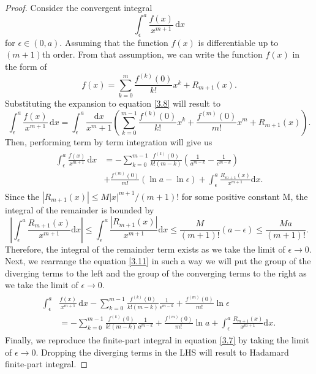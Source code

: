 \begin{proof}
Consider the convergent integral 
\begin{equation}
    \int_\epsilon^a \frac{f(x)}{x^{m+1}} \, \mathrm{d}x
    \label{3.8}
\end{equation}
for $\epsilon \in (0,a)$. Assuming that the function $f(x)$ is differentiable up to $(m+1)$th order. From that assumption, we can write the function $f(x)$ in the form of 
\begin{equation}
    f(x) = \sum_{k=0}^{m} \frac{f^{(k)}(0)}{k!} x^{k} + R_{m+1}(x).
\end{equation}
Substituting the expansion to equation \eqref{3.8} will result to
\begin{equation}
    \int_\epsilon^a \frac{f(x)}{x^{m+1}} \, \mathrm{d}x = \int_\epsilon^{a} \frac{\mathrm{d}x}{x^m+1} \left( \sum_{k=0}^{m-1} \frac{f^{(k)}(0)}{k!}x^{k} + \frac{f^{(m)}(0)}{m!}x^{m} + R_{m+1}(x) \right).
\end{equation}
Then, performing term by term integration will give us
\begin{align}
\begin{split}
    \int_\epsilon^a \frac{f(x)}{x^{m+1}} \, \mathrm{d}x & =- \sum_{k=0}^{m-1} \frac{f^{(k)}(0)}{k!(m-k)} \left( \frac{1}{a^{m-k}} - \frac{1}{\epsilon^{m-k}} \right) \\& +  \frac{f^{(m)}(0)}{m!} \left( \ln a - \ln \epsilon \right) + \int_\epsilon^{a}\frac{R_{m+1}(x)}{x^{m+1}} \mathrm{d}x.
    \label{3.11}
\end{split}
\end{align}
Since the $|R_{m+1}(x)| \leq M|x|^{m+1}/(m+1)! $ for some positive constant M, the integral of the remainder is bounded by 
\begin{equation}
   \left| \int_\epsilon^{a}\frac{R_{m+1}(x)}{x^{m+1}} \mathrm{d}x \right| \leq \int_\epsilon^{a}\frac{|R_{m+1}(x)|}{x^{m+1}} \mathrm{d}x \leq \frac{M}{(m+1)!} (a- \epsilon) \leq \frac{Ma}{(m+1)!}.
\end{equation}
Therefore, the integral of the remainder term exists as we take the limit of $\epsilon \to 0$. Next, we rearrange the equation \eqref{3.11} in such a way we will put the group of the diverging terms to the left and the group of the converging terms to the right as we take the limit of $\epsilon \to 0$.
\begin{align}
\begin{split}
    \int_\epsilon^a & \frac{f(x)}{x^{m+1}} \, \mathrm{d}x  - \sum_{k=0}^{m-1} \frac{f^{(k)}(0)}{k!(m-k)} \frac{1}{\epsilon^{m-k}} + \frac{f^{(m)}(0)}{m!} \ln \epsilon \\& = -\sum_{k=0}^{m-1} \frac{f^{(k)}(0)}{k!(m-k)} \frac{1}{a^{m-k}} +  \frac{f^{(m)}(0)}{m!} \ln a + \int_\epsilon^{a}\frac{R_{m+1}(x)}{x^{m+1}} \mathrm{d}x.
\end{split}
\end{align}
Finally, we reproduce the finite-part integral in equation \eqref{3.7} by taking the limit of $\epsilon \to 0$. Dropping the diverging terms in the LHS will result to Hadamard finite-part integral.
\end{proof}



